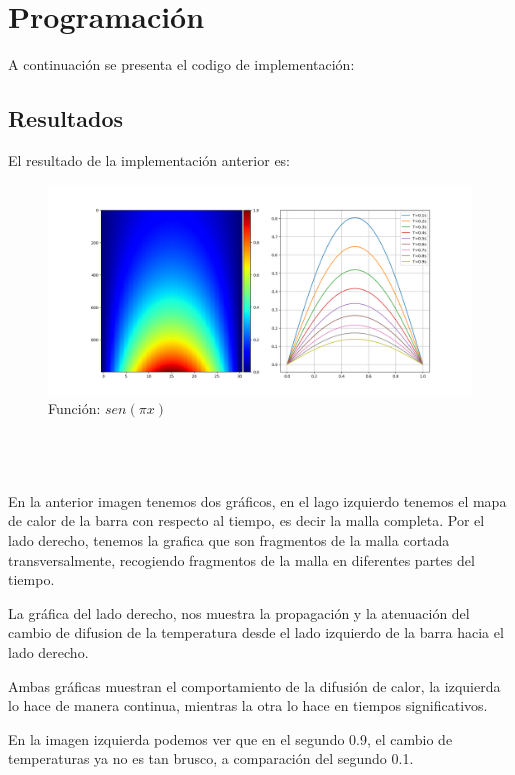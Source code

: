 \documentclass[a4paper,12pt]{article}
\newcommand{\eq}[1]{$#1$}
\begin{document}
    \section{Programación}
    A continuación se presenta el codigo de implementación:
    
    
    \subsection{Resultados}
    El resultado de la implementación anterior es:
    \begin{figure}[h]
        \centering
        \includegraphics[width=\textwidth]{ejer1_graph.png}
        \caption{Función: \eq{sen(\pi x)}}
    \end{figure}
    \\\\\\
    En la anterior imagen tenemos dos gráficos, en el lago izquierdo tenemos
    el mapa de calor de la barra con respecto al tiempo, es decir la malla completa.
    Por el lado derecho, tenemos la grafica que son fragmentos de la malla cortada
    transversalmente, recogiendo fragmentos de la malla en diferentes partes del tiempo.

    La gráfica del lado derecho, nos muestra la propagación y la atenuación del cambio 
    de difusion de la temperatura desde el lado izquierdo de la barra hacia el lado derecho.

    Ambas gráficas muestran el comportamiento de la difusión de calor, la izquierda lo hace de manera continua, 
    mientras la otra lo hace en tiempos significativos.

    En la imagen izquierda podemos ver que en el segundo 0.9, el cambio de temperaturas
    ya no es tan brusco, a comparación del segundo 0.1.
\end{document}

